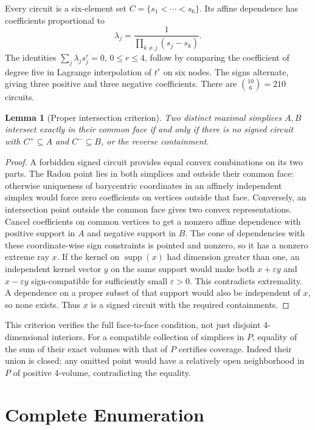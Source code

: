 \documentclass[11pt]{article}
\newtheorem{lemma}{Lemma}
\begin{document}
Every circuit is a six-element set $C=\{s_1<\cdots<s_6\}$. Its affine
dependence has coefficients proportional to
\[
\lambda_j=\frac{1}{\prod_{k\ne j}(s_j-s_k)}.
\]
The identities $\sum_j\lambda_j s_j^r=0$, $0\leq r\leq4$, follow by comparing
the coefficient of degree five in Lagrange interpolation of $t^r$ on six
nodes. The signs alternate, giving three positive and three negative
coefficients. There are $\binom{10}{6}=210$ circuits.

\begin{lemma}[Proper intersection criterion]
Two distinct maximal simplices $A,B$ intersect exactly in their common face
if and only if there is no signed circuit with $C^+\subseteq A$ and
$C^-\subseteq B$, or the reverse containment.
\end{lemma}
\begin{proof}
A forbidden signed circuit provides equal convex combinations on its two
parts. The Radon point lies in both simplices and outside their common face:
otherwise uniqueness of barycentric coordinates in an affinely independent
simplex would force zero coefficients on vertices outside that face. Conversely,
an intersection point outside the common face gives two convex representations.
Cancel coefficients on common vertices to get a nonzero affine dependence with
positive support in $A$ and negative support in $B$. The cone of dependencies with these coordinate-wise sign constraints is
pointed and nonzero, so it has a nonzero extreme ray $x$. If the kernel on
$\operatorname{supp}(x)$ had dimension greater than one, an independent kernel
vector $y$ on the same support would make both $x+\varepsilon y$ and
$x-\varepsilon y$ sign-compatible for sufficiently small $\varepsilon>0$.
This contradicts extremality. A dependence on a proper subset of that support
would also be independent of $x$, so none exists. Thus $x$ is a signed circuit
with the required containments.
\end{proof}

This criterion verifies the full face-to-face condition, not just disjoint
4-dimensional interiors. For a compatible collection of simplices in $P$,
equality of the sum of their exact volumes with that of $P$ certifies coverage.
Indeed their union is closed; any omitted point would have a relatively open
neighborhood in $P$ of positive 4-volume, contradicting the equality.

\section{Complete Enumeration}
\end{document}
